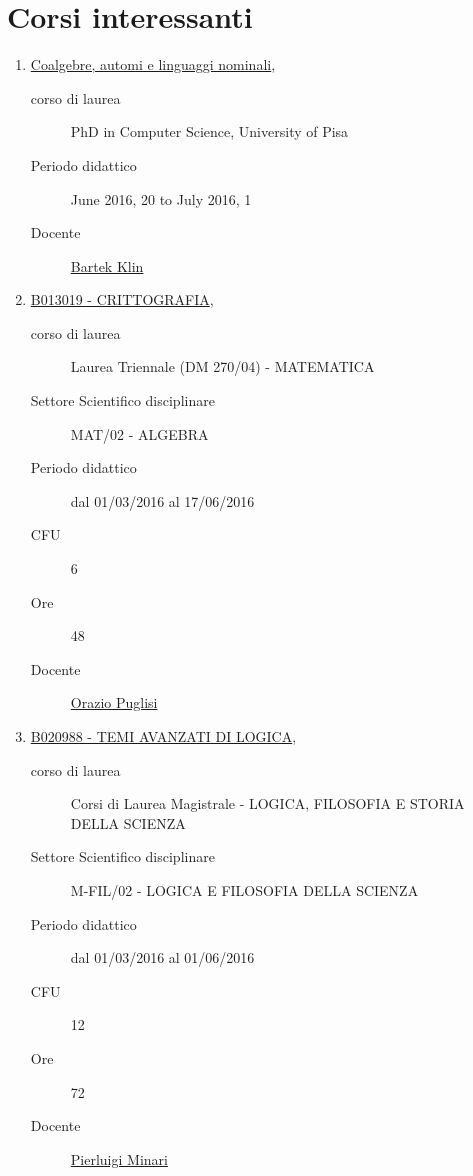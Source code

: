 \documentclass[11pt]{article}
\begin{document}
\section*{Corsi interessanti}

\begin{enumerate}

\item \href{http://www.di.unipi.it/en/phd/phd-teaching/phd-courses/2016/891-coalgebre-automi-e-linguaggi-nominali-ecc}{Coalgebre, automi e linguaggi nominali},
    \begin{description}
        \item[corso di laurea] PhD in Computer Science, University of Pisa
        \item[Periodo didattico] June 2016, 20 to July 2016, 1
        \item[Docente] \href{http://www.mimuw.edu.pl/~klin/}{Bartek Klin}

    \end{description}

\item \href{http://www.unifi.it/index.php?module=ofform2&mode=1&cmd=3&AA=2015&afId=359747}{B013019 - CRITTOGRAFIA},
    \begin{description}
        \item[corso di laurea] Laurea Triennale (DM 270/04) - MATEMATICA
        \item[Settore Scientifico disciplinare] MAT/02 - ALGEBRA
        \item[Periodo didattico] dal 01/03/2016 al 17/06/2016
        \item[CFU] 6
        \item[Ore] 48
        \item[Docente] \href{http://www.unifi.it/p-doc2-2015-0-A-2b333c2b3228-0.html}{Orazio Puglisi}

    \end{description}

\item \href{http://www.unifi.it/index.php?module=ofform2&mode=1&cmd=3&AA=2015&afId=427440}{B020988 - TEMI AVANZATI DI LOGICA},
    \begin{description}
        \item[corso di laurea] Corsi di Laurea Magistrale - LOGICA, FILOSOFIA E STORIA DELLA SCIENZA
        \item[Settore Scientifico disciplinare] M-FIL/02 - LOGICA E FILOSOFIA DELLA SCIENZA
        \item[Periodo didattico] dal 01/03/2016 al 01/06/2016
        \item[CFU] 12 
        \item[Ore] 72
        \item[Docente] \href{http://www.unifi.it/p-doc2-2015-0-A-2b333b2c362a-0.html}{Pierluigi Minari}


\end{description}
\end{enumerate}
\end{document}

